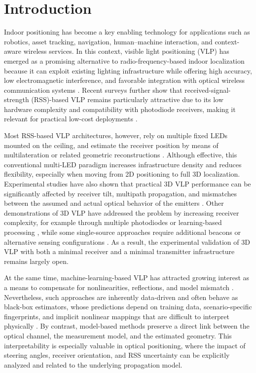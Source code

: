 \section{Introduction}

Indoor positioning has become a key enabling technology for applications such as robotics, asset tracking, navigation, human--machine interaction, and context-aware wireless services. In this context, visible light positioning (VLP) has emerged as a promising alternative to radio-frequency-based indoor localization because it can exploit existing lighting infrastructure while offering high accuracy, low electromagnetic interference, and favorable integration with optical wireless communication systems \cite{Wang2024,Zhu2025}. Recent surveys further show that received-signal-strength (RSS)-based VLP remains particularly attractive due to its low hardware complexity and compatibility with photodiode receivers, making it relevant for practical low-cost deployments \cite{Wang2024,Zhu2025}.

Most RSS-based VLP architectures, however, rely on multiple fixed LEDs mounted on the ceiling, and estimate the receiver position by means of multilateration or related geometric reconstructions \cite{Wang2024,Almadani2021}. Although effective, this conventional multi-LED paradigm increases infrastructure density and reduces flexibility, especially when moving from 2D positioning to full 3D localization. Experimental studies have also shown that practical 3D VLP performance can be significantly affected by receiver tilt, multipath propagation, and mismatches between the assumed and actual optical behavior of the emitters \cite{Almadani2021}. Other demonstrations of 3D VLP have addressed the problem by increasing receiver complexity, for example through multiple photodiodes or learning-based processing \cite{Zhang2020}, while some single-source approaches require additional beacons or alternative sensing configurations \cite{Huaping2020}. As a result, the experimental validation of 3D VLP with both a minimal receiver and a minimal transmitter infrastructure remains largely open.

At the same time, machine-learning-based VLP has attracted growing interest as a means to compensate for nonlinearities, reflections, and model mismatch \cite{Tran2022}. Nevertheless, such approaches are inherently data-driven and often behave as black-box estimators, whose predictions depend on training data, scenario-specific fingerprints, and implicit nonlinear mappings that are difficult to interpret physically \cite{Tran2022}. By contrast, model-based methods preserve a direct link between the optical channel, the measurement model, and the estimated geometry. This interpretability is especially valuable in optical positioning, where the impact of steering angles, receiver orientation, and RSS uncertainty can be explicitly analyzed and related to the underlying propagation model.


